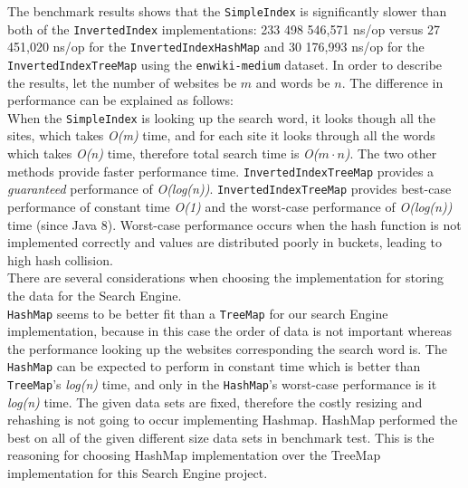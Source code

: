 The benchmark results shows that the {\tt SimpleIndex} is significantly slower than both of the {\tt InvertedIndex} implementations: 233 498 546,571 ns/op versus 27 451,020 ns/op for the {\tt InvertedIndexHashMap} and 30 176,993 ns/op for the {\tt InvertedIndexTreeMap} using the {\tt enwiki-medium} dataset.
In order to describe the results, let the number of websites be $m$ and words be $n$.
The difference in performance can be explained as follows:\\
When the {\tt SimpleIndex} is looking up the search word, it looks though all the sites, which takes \textit{O(m)} time, and for each site it looks through all the words which takes \textit{O(n)} time, therefore total search time is \textit{O($m\cdot n$)}. The two other methods provide faster performance time. {\tt InvertedIndexTreeMap} provides a \textit{guaranteed} performance of \textit{O(log(n))}. {\tt InvertedIndexTreeMap} provides best-case performance of constant time \textit{O(1)} and the worst-case performance of \textit{O(log(n))} time (since Java 8). Worst-case performance occurs when the hash function is not implemented correctly and values are distributed poorly in buckets, leading to high hash collision.\\
There are several considerations when choosing the implementation for storing the data for the Search Engine.\\
{\tt HashMap} seems to be better fit than a {\tt TreeMap} for our search Engine implementation, because in this case the order of data is not important whereas the performance looking up the websites corresponding the search word is. The {\tt HashMap} can be expected to perform in constant time which is better than {\tt TreeMap}'s \textit{log(n)} time, and only in the {\tt HashMap}'s worst-case performance is it \textit{log(n)} time. The given data sets are fixed, therefore the costly resizing and rehashing is not going to occur implementing Hashmap. HashMap performed the best on all of the given different size data sets in benchmark test. This is the reasoning for choosing HashMap implementation over the TreeMap implementation for this Search Engine project.

